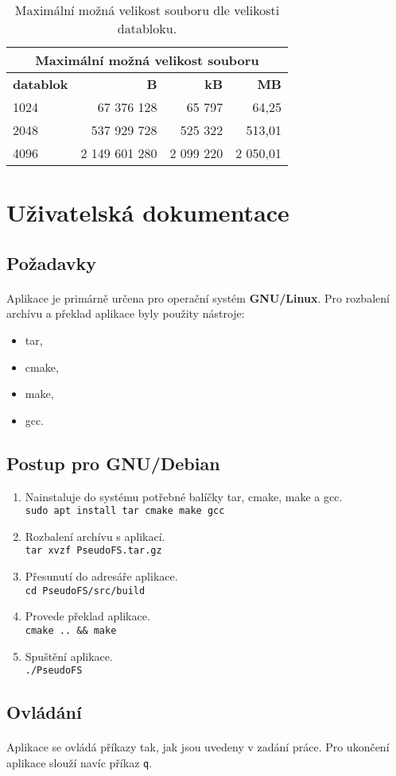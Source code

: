 \documentclass[12pt]{scrartcl}
\begin{document}
\begin{table}[!ht]
\centering
\begin{tabular}{|l|r|r|r|}
\hline
\multicolumn{4}{|c|}{\textbf{Maximální možná velikost souboru}}             \\ \hline
\textbf{datablok} & \textbf{B} & \textbf{kB} & \textbf{MB} \\ \hline
1024 & 67 376 128 & 65 797 & 64,25 \\ \hline
2048 & 537 929 728 & 525 322 & 513,01 \\ \hline
4096 & 2 149 601 280 & 2 099 220 & 2 050,01 \\ \hline
\end{tabular}
\caption{Maximální možná velikost souboru dle velikosti databloku.}
\label{os-share}
\end{table}

\newpage
\section{Uživatelská dokumentace}
\subsection{Požadavky}
\paragraph{}
Aplikace je primárně určena pro operační systém \textbf{GNU/Linux}. Pro rozbalení archívu a překlad aplikace byly použity nástroje:
\begin{itemize}
\item tar,
\item cmake,
\item make,
\item gcc.
\end{itemize}

\subsection{Postup pro GNU/Debian}
\begin{enumerate}
\item Nainstaluje do systému potřebné balíčky tar, cmake, make a gcc.\\
\texttt{sudo apt install tar cmake make gcc}
\item Rozbalení archívu s aplikací.\\
\texttt{tar xvzf PseudoFS.tar.gz}
\item Přesunutí do adresáře aplikace.\\
\texttt{cd PseudoFS/src/build}
\item Provede překlad aplikace.\\
\texttt{cmake .. \&\& make}
\item Spuštění aplikace.\\
\texttt{./PseudoFS}
\end{enumerate}

\subsection{Ovládání}
\paragraph{}
Aplikace se ovládá příkazy tak, jak jsou uvedeny v zadání práce. Pro ukončení aplikace slouží navíc příkaz \texttt{q}.
\end{document}
